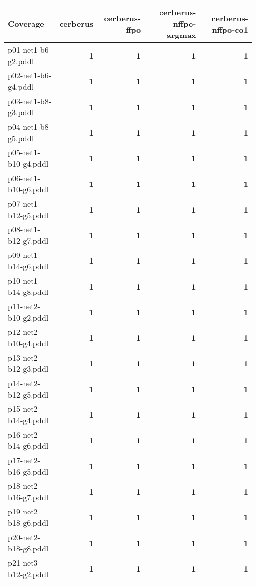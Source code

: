 \documentclass{article}
\begin{document}
\begin{tabular}{@{}lrrrr@{}}
Coverage & cerberus & cerberus-ffpo & cerberus-nffpo-argmax & cerberus-nffpo-co1 \\
\midrule
p01-net1-b6-g2.pddl & \textbf{1} & \textbf{1} & \textbf{1} & \textbf{1} \\
p02-net1-b6-g4.pddl & \textbf{1} & \textbf{1} & \textbf{1} & \textbf{1} \\
p03-net1-b8-g3.pddl & \textbf{1} & \textbf{1} & \textbf{1} & \textbf{1} \\
p04-net1-b8-g5.pddl & \textbf{1} & \textbf{1} & \textbf{1} & \textbf{1} \\
p05-net1-b10-g4.pddl & \textbf{1} & \textbf{1} & \textbf{1} & \textbf{1} \\
p06-net1-b10-g6.pddl & \textbf{1} & \textbf{1} & \textbf{1} & \textbf{1} \\
p07-net1-b12-g5.pddl & \textbf{1} & \textbf{1} & \textbf{1} & \textbf{1} \\
p08-net1-b12-g7.pddl & \textbf{1} & \textbf{1} & \textbf{1} & \textbf{1} \\
p09-net1-b14-g6.pddl & \textbf{1} & \textbf{1} & \textbf{1} & \textbf{1} \\
p10-net1-b14-g8.pddl & \textbf{1} & \textbf{1} & \textbf{1} & \textbf{1} \\
p11-net2-b10-g2.pddl & \textbf{1} & \textbf{1} & \textbf{1} & \textbf{1} \\
p12-net2-b10-g4.pddl & \textbf{1} & \textbf{1} & \textbf{1} & \textbf{1} \\
p13-net2-b12-g3.pddl & \textbf{1} & \textbf{1} & \textbf{1} & \textbf{1} \\
p14-net2-b12-g5.pddl & \textbf{1} & \textbf{1} & \textbf{1} & \textbf{1} \\
p15-net2-b14-g4.pddl & \textbf{1} & \textbf{1} & \textbf{1} & \textbf{1} \\
p16-net2-b14-g6.pddl & \textbf{1} & \textbf{1} & \textbf{1} & \textbf{1} \\
p17-net2-b16-g5.pddl & \textbf{1} & \textbf{1} & \textbf{1} & \textbf{1} \\
p18-net2-b16-g7.pddl & \textbf{1} & \textbf{1} & \textbf{1} & \textbf{1} \\
p19-net2-b18-g6.pddl & \textbf{1} & \textbf{1} & \textbf{1} & \textbf{1} \\
p20-net2-b18-g8.pddl & \textbf{1} & \textbf{1} & \textbf{1} & \textbf{1} \\
p21-net3-b12-g2.pddl & \textbf{1} & \textbf{1} & \textbf{1} & \textbf{1} \\

\end{tabular}
\end{document}
